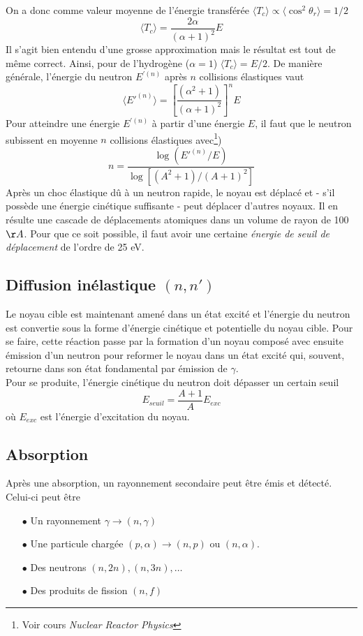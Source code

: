 On a donc comme valeur moyenne de l'énergie transférée $\langle T_c\rangle \propto \langle
\cos^2\theta_r\rangle = 1/2$
\begin{equation}
\langle T_c \rangle =\frac{2\alpha}{(\alpha+1)^2}E
\end{equation}
Il s'agit bien entendu d'une grosse approximation mais le résultat est tout de même correct. Ainsi, 
pour de l'hydrogène ($\alpha=1$) $\langle T_c \rangle = E/2$. De manière générale, l'énergie du 
neutron $E^{'(n)}$ après $n$ collisions élastiques vaut
\begin{equation}
\langle E'^{(n)} \rangle =\left[\frac{(\alpha^2+1)}{(\alpha+1)^2}\right]^nE
\end{equation}
Pour atteindre une énergie $E^{'(n)}$ à partir d'une énergie $E$, il faut que le neutron subissent
en moyenne $n$ collisions élastiques avec\footnote{Voir cours \textit{Nuclear Reactor Physics}})
\begin{equation}
n = \frac{\log{(E'^{(n)}/E)}}{\log{[(A^2+1)/(A+1)^2]}}
\end{equation}
Après un choc élastique dû à un neutron rapide, le noyau est déplacé et - s'il possède une énergie
cinétique suffisante - peut déplacer d'autres noyaux. Il en résulte une cascade de déplacements
atomiques dans un volume de rayon de 100 $\AA$. Pour que ce soit possible, il faut avoir une 
certaine \textit{énergie de seuil de déplacement} de l'ordre de 25 eV.

\subsection{Diffusion inélastique $(n,n')$}%
Le noyau cible est maintenant amené dans un état excité et l'énergie du neutron est convertie sous
la forme d'énergie cinétique et potentielle du noyau cible. Pour se faire, cette réaction passe
par la formation d'un noyau composé avec ensuite émission d'un neutron pour reformer le noyau dans
un état excité qui, souvent, retourne dans son état fondamental par émission de $\gamma$. \\

Pour se produite, l'énergie cinétique du neutron doit dépasser un certain seuil
\begin{equation}
E_{seuil}=\frac{A+1}{A}E_{exc}
\end{equation}
où $E_{exc}$ est l'énergie d'excitation du noyau. 


\subsection{Absorption}%
Après une absorption, un rayonnement secondaire peut être émis et détecté. Celui-ci peut être
\begin{itemize}
\item[$\bullet$] Un rayonnement $\gamma \to (n,\gamma)$
\item[$\bullet$] Une particule chargée $(p,\alpha)\to (n,p)$ ou $(n,
\alpha)$.
\item[$\bullet$] Des neutrons $(n,2n), (n,3n),\dots$
\item[$\bullet$] Des produits de fission $(n,f)$
\end{itemize}


